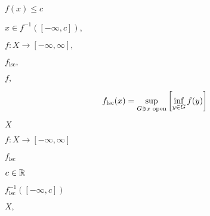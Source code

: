 \documentclass[10pt]{book}
\begin{document}
\begin{mdSnippets}
\begin{mdInlineSnippet}[495b622e824b97b8d8e1d1981d5dbb2d]%
$f(x) \le c$\end{mdInlineSnippet}%
\begin{mdInlineSnippet}[461478f20cb52861ec677e2b3029eef8]%
$x \in f^{-1}([-\infty, c]),$\end{mdInlineSnippet}%
\begin{mdInlineSnippet}%
$f: X \to [-\infty, \infty],$\end{mdInlineSnippet}%
\begin{mdInlineSnippet}[c7ae4e1c30f72247767a2cdc193de4ec]%
$f_\text{lsc},$\end{mdInlineSnippet}%
\begin{mdInlineSnippet}[0e05bed100c5460dd523f83322b3e4d7]%
$f,$\end{mdInlineSnippet}%
\begin{mdDisplaySnippet}[c6054d0f8b02754c25bdb53421a42bd4]%
\[%
f_\text{lsc}(x) = \sup_{G \ni x \text{ open}} \qty[\inf_{y \in G} f(y)]
\]%
\end{mdDisplaySnippet}%
\begin{mdInlineSnippet}[02129bb861061d1a052c592e2dc6b383]%
$X$\end{mdInlineSnippet}%
\begin{mdInlineSnippet}[9c3729f1b2ef77b97bbdb1135d803c69]%
$f: X \to [-\infty, \infty]$\end{mdInlineSnippet}%
\begin{mdInlineSnippet}[4a08201c96014391857403079b385a9d]%
$f_\text{lsc}$\end{mdInlineSnippet}%
\begin{mdInlineSnippet}%
$c \in \mathbb{R}$\end{mdInlineSnippet}%
\begin{mdInlineSnippet}%
$f_\text{lsc}^{-1}([-\infty, c])$\end{mdInlineSnippet}%
\begin{mdInlineSnippet}[412bd1def2f1b61da9169d88e6c8b9e9]%
$X,$\end{mdInlineSnippet}%
\begin{mdInlineSnippet}[9a7859563ae8bcfe2b67b09eb067e6f0]%

\end{mdInlineSnippet}
\end{mdSnippets}
\end{document}
